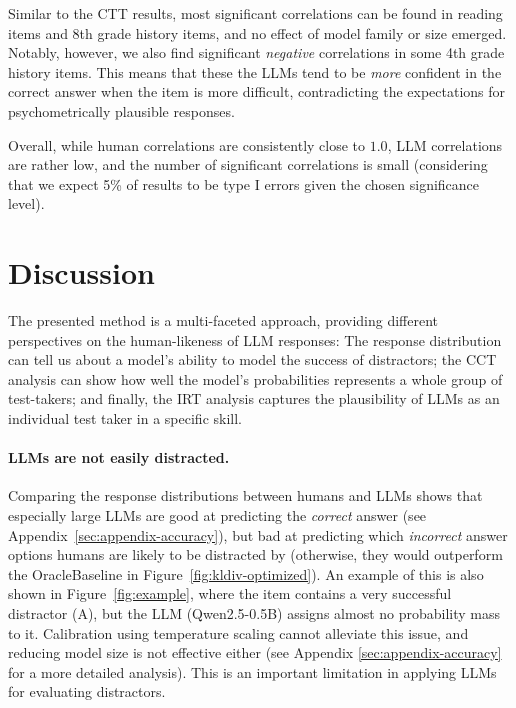 \documentclass[11pt]{article}
\begin{document}
Similar to the CTT results, most significant correlations can be found in reading items and 8th grade history items, and no effect of model family or size emerged. Notably, however, we also find significant \emph{negative} correlations in some 4th grade history items. This means that these the LLMs tend to be \emph{more} confident in the correct answer when the item is more difficult, contradicting the expectations for psychometrically plausible responses.

Overall, while human correlations are consistently close to $1.0$, LLM correlations are rather low, and the number of significant correlations is small (considering that we expect 5\% of results to be type I errors given the chosen significance level).


\section{Discussion}

The presented method is a multi-faceted approach, providing different perspectives on the human-likeness of LLM responses: The response distribution can tell us about a model's ability to model the success of distractors; the CCT analysis can show how well the model's probabilities represents a whole group of test-takers; and finally, the IRT analysis captures the plausibility of LLMs as an individual test taker in a specific skill.

\paragraph{LLMs are not easily distracted.}

Comparing the response distributions between humans and LLMs shows that especially large LLMs are good at predicting the \emph{correct} answer (see Appendix~\ref{sec:appendix-accuracy}), but bad at predicting which \emph{incorrect} answer options humans are likely to be distracted by (otherwise, they would outperform the OracleBaseline in Figure~\ref{fig:kldiv-optimized}). An example of this is also shown in Figure~\ref{fig:example}, where the item contains a very successful distractor (A), but the LLM (Qwen2.5-0.5B) assigns almost no probability mass to it. Calibration using temperature scaling cannot alleviate this issue, and reducing model size is not effective either (see Appendix \ref{sec:appendix-accuracy} for a more detailed analysis). This is an important limitation in applying LLMs for evaluating distractors.
\end{document}
